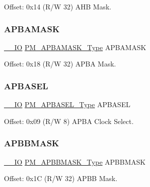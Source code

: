 Offset\+: 0x14 (R/W 32) A\+HB Mask. 

\mbox{\label{struct_pm_a468bceadd4f6d2169b62a05a172a8844}} 
\subsubsection{\texorpdfstring{APBAMASK}{APBAMASK}}
{\footnotesize\ttfamily \mbox{\hyperlink{core__cm0plus_8h_aec43007d9998a0a0e01faede4133d6be}{\+\_\+\+\_\+\+IO}} \mbox{\hyperlink{union_p_m___a_p_b_a_m_a_s_k___type}{P\+M\+\_\+\+A\+P\+B\+A\+M\+A\+S\+K\+\_\+\+Type}} A\+P\+B\+A\+M\+A\+SK}



Offset\+: 0x18 (R/W 32) A\+P\+BA Mask. 

\mbox{\label{struct_pm_a126ebf68bf07133ba564588763a2f506}} 
\subsubsection{\texorpdfstring{APBASEL}{APBASEL}}
{\footnotesize\ttfamily \mbox{\hyperlink{core__cm0plus_8h_aec43007d9998a0a0e01faede4133d6be}{\+\_\+\+\_\+\+IO}} \mbox{\hyperlink{union_p_m___a_p_b_a_s_e_l___type}{P\+M\+\_\+\+A\+P\+B\+A\+S\+E\+L\+\_\+\+Type}} A\+P\+B\+A\+S\+EL}



Offset\+: 0x09 (R/W 8) A\+P\+BA Clock Select. 

\mbox{\label{struct_pm_afacc529beb39c2f6835bcf232c97f4ed}} 
\subsubsection{\texorpdfstring{APBBMASK}{APBBMASK}}
{\footnotesize\ttfamily \mbox{\hyperlink{core__cm0plus_8h_aec43007d9998a0a0e01faede4133d6be}{\+\_\+\+\_\+\+IO}} \mbox{\hyperlink{union_p_m___a_p_b_b_m_a_s_k___type}{P\+M\+\_\+\+A\+P\+B\+B\+M\+A\+S\+K\+\_\+\+Type}} A\+P\+B\+B\+M\+A\+SK}



Offset\+: 0x1C (R/W 32) A\+P\+BB Mask. 

\mbox{\label{struct_pm_adcd9c9b53db7ddf3ec3b5876295dcee3}} 
